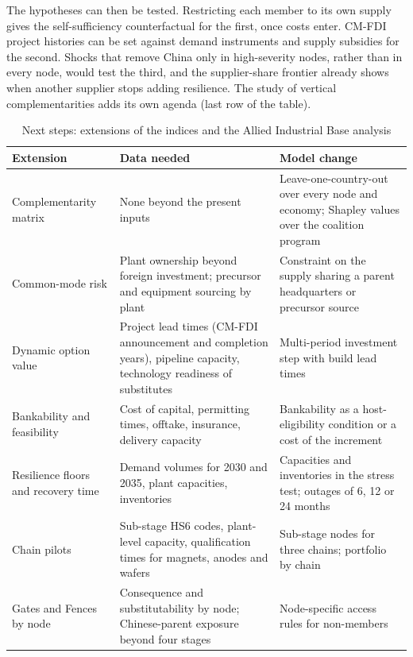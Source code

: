 The hypotheses can then be tested. Restricting each member to its own supply gives the
self-sufficiency counterfactual for the first, once costs enter. CM-FDI project histories can be set
against demand instruments and supply subsidies for the second. Shocks that remove China only in
high-severity nodes, rather than in every node, would test the third, and the supplier-share frontier
already shows when another supplier stops adding resilience. The study of vertical complementarities
adds its own agenda (last row of the table).

\begin{table}[htbp]
  \centering
  \begin{threeparttable}
  \caption{Next steps: extensions of the indices and the Allied Industrial Base analysis}
  \label{tab:discussion_agenda}
  \footnotesize
  \begin{tabularx}{\textwidth}{@{}>{\raggedright\arraybackslash}p{}
      >{\raggedright\arraybackslash}X >{\raggedright\arraybackslash}X@{}}
    \toprule
    Extension & Data needed & Model change \\
    \midrule
    Complementarity matrix & None beyond the present inputs & Leave-one-country-out over every node and economy; Shapley values over the coalition program \\
    Common-mode risk & Plant ownership beyond foreign investment; precursor and equipment sourcing by plant & Constraint on the supply sharing a parent headquarters or precursor source \\
    Dynamic option value & Project lead times (CM-FDI announcement and completion years), pipeline capacity, technology readiness of substitutes & Multi-period investment step with build lead times \\
    Bankability and feasibility & Cost of capital, permitting times, offtake, insurance, delivery capacity \citep{spokas2025systemic} & Bankability as a host-eligibility condition or a cost of the increment \\
    Resilience floors and recovery time & Demand volumes for 2030 and 2035, plant capacities, inventories & Capacities and inventories in the stress test; outages of 6, 12 or 24 months \\
    Chain pilots & Sub-stage HS6 codes, plant-level capacity, qualification times for magnets, anodes and wafers & Sub-stage nodes for three chains; portfolio by chain \\
    Gates and Fences by node & Consequence and substitutability by node; Chinese-parent exposure beyond four stages & Node-specific access rules for non-members \\

\end{tabularx}
\end{threeparttable}
\end{table}
